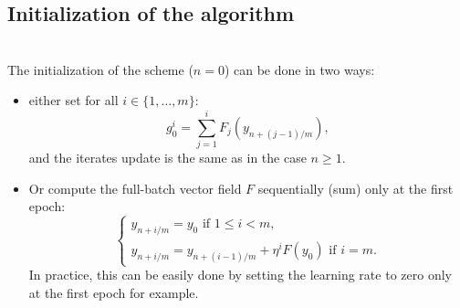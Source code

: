\documentclass[article,authoryear,jmlmc]{beg_32}             %
\begin{document}
\subsection{Initialization of the algorithm}
~~\\
The initialization of the scheme ($n=0$) can be done in two ways:
\begin{itemize}
	\item either set for all $i\in \{1,\dots,m\}$:
	\begin{equation*}
		g_0^i = \sum_{j=1}^i F_j\left(y_{n+(j-1)/m}\right),
	\end{equation*}
	and the iterates update is the same as in the case $n\geq 1$.
	\item Or compute the full-batch vector field $F$ sequentially (sum) only at the first epoch:
	\begin{equation*}
		\left\{
		\begin{array}{ll}
			y_{n+i/m}=y_0 \text{ if } 1\leq i<m, \\
			y_{n+i/m} = y_{n+(i-1)/m}+\eta^i F(y_0) \text{ if } i=m.
		\end{array}
		\right.
	\end{equation*}
        In practice, this can be easily done by setting the learning rate to zero only at the first epoch for example. 
\end{itemize}
\end{document}
